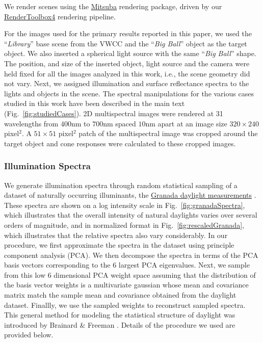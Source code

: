 \documentclass{jov}
\begin{document}
We render scenes using the \href{https://www.mitsuba-renderer.org}{Mitsuba} \cite{jakob2015mitsuba} rendering package, driven by our \href{http://rendertoolbox.org}{RenderToolbox4} \cite{heasly2014rendertoolbox3} rendering pipeline.

For the images used for the primary results reported in this paper, we used the ``{\it Library}'' base scene from the VWCC  and the ``{\it Big Ball}'' object as the target object. We also inserted a spherical light source with the same ``{\it Big Ball}'' shape. The position, and size of the inserted object, light source and the camera were held fixed for all the images analyzed in this work, i.e., the scene geometry did not vary. Next, we assigned illumination and surface reflectance spectra to the lights and objects in the scene. The spectral manipulations for the various cases studied in this work have been described in the main text (Fig.~\ref{fig:studiedCases}). 2D multispectral images were rendered at 31 wavelengths from $400$nm to $700$nm spaced $10$nm apart at an image size $320\times 240$ pixel$^2$. A $51 \times 51$ pixel$^2$ patch of the multispectral image was cropped around the target object and cone responses were calculated to these cropped images. 

\subsubsection{Illumination Spectra}
We generate illumination spectra  through random statistical sampling of a dataset of naturally occurring illuminants, the \href{http://colorimaginglab.ugr.es/pages/Data}{Granada daylight measurements} \cite{peyvandi2016colorimetric}.  These spectra are shown on a log intensity scale in Fig.~\ref{fig:granadaSpectra}, which illustrates that the overall intensity of natural daylights varies over several orders of magnitude, and in normalized format in Fig.~\ref{fig:rescaledGranada}, which illustrates that the relative spectra also vary considerably.  In our procedure, we first approximate the spectra in the dataset using principle component analysis (PCA). We then decompose the spectra in terms of the PCA basis vectors corresponding to the 6 largest PCA eigenvalues. Next, we sample from this low 6 dimensional PCA weight space assuming that the distribution of the basis vector weights is a multivariate gaussian whose mean and covariance matrix match the sample mean and covariance obtained from the daylight dataset. Finallly, we use the sampled weights to reconstruct sampled spectra. This general method for modeling the statistical structure of daylight was introduced by Brainard \& Freeman \cite{BrainardFreeman}. Details of the procedure we used are provided below.
\end{document}
